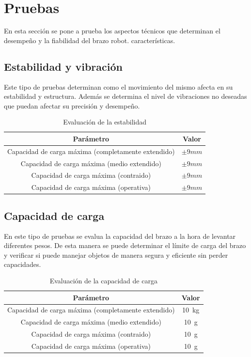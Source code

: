 \newpage
\section{Pruebas}
En esta sección se pone a prueba los aspectos técnicos que determinan el desempeño y la fiabilidad del brazo robot. 
características.

\subsection{Estabilidad y vibración}
Este tipo de pruebas determinan como el movimiento del mismo afecta en su estabilidad y estructura. Además se determina el nivel de 
vibraciones no deseadas que puedan afectar su precisión y desempeño.
\begin{table}[H]
\begin{center}
\begin{tabular}{|c|c|}
\hline
\textbf{Parámetro} & \textbf{Valor} \\
\hline
Capacidad de carga máxima (completamente extendido) & $\pm9mm$\\
Capacidad de carga máxima (medio extendido) & $\pm9mm$\\
Capacidad de carga máxima (contraido) & $\pm9mm$\\
Capacidad de carga máxima (operativa) & $\pm9mm$\\
\hline
\end{tabular}
\caption{Evaluación de la estabilidad}
\label{cuadro:evaluacion_estabilidad}
\end{center}
\end{table}

\subsection{Capacidad de carga}
En este tipo de pruebas se evalua la capacidad del brazo a la hora de levantar diferentes pesos. De esta manera se puede determinar 
el límite de carga del brazo y verificar si puede manejar objetos de manera segura y eficiente sin perder capacidades.
\begin{table}[H]
\begin{center}
\begin{tabular}{|c|c|}
\hline
\textbf{Parámetro} & \textbf{Valor} \\
\hline
Capacidad de carga máxima (completamente extendido) & \SI{10}{\kilo\gram} \\
Capacidad de carga máxima (medio extendido) & \SI{10}{\gram} \\
Capacidad de carga máxima (contraido) & \SI{10}{\gram} \\
Capacidad de carga máxima (operativa) & \SI{10}{\gram} \\
\hline
\end{tabular}
\caption{Evaluación de la capacidad de carga}
\label{cuadro:evaluacion_carga}
\end{center}
\end{table}

